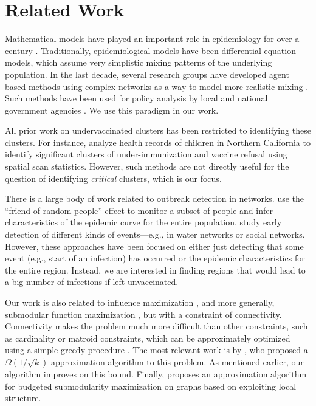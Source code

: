 \section{Related Work}
Mathematical models have played an important role in epidemiology for over a century \cite{anderson+m:book}. Traditionally, epidemiological models have been differential equation models, which assume very simplistic mixing patterns of the underlying population. In the last decade, several research groups have developed agent based methods
using complex networks as a way to model more realistic mixing
\cite{eubank:nature04,longini05:science,fc+06,Liu2015}.
Such methods have been used for policy analysis
by local and national government agencies \cite{halloran:pnas08}.
We use this paradigm in our work.

All prior work on undervaccinated clusters has been restricted to identifying these clusters.
For instance, \cite{lieu2015geographic} analyze health records 
of children in Northern California to identify
significant clusters of under-immunization and vaccine refusal
using spatial scan statistics. However, such methods are not directly useful for the
question of identifying \emph{critical} clusters, which is our focus.

There is a large body of work related to outbreak detection in networks. \cite{christakis:10:sensor} use the ``friend of random people'' effect to monitor a subset of people and infer characteristics of the  epidemic curve for the entire population. \cite{Leskovec@KDD07} study early detection of different kinds of events---e.g., in water networks or social networks. However, these approaches have been focused on either just detecting that some event (e.g., start of an infection) has occurred or the epidemic characteristics for the entire region. Instead, we are interested in finding regions that would lead to a big number of infections if left unvaccinated.

Our work is also related to influence maximization \cite{kempe:sigkdd03}, and more generally, 
submodular function maximization \cite{Krause2014SubmodularFM}, but with a constraint of connectivity. Connectivity makes the problem much more difficult than other constraints, such as cardinality or matroid constraints, which can be approximately optimized using a simple greedy procedure \cite{nemhauser1978analysis}. 
The most relevant work is by \cite{kuo2015maximizing}, who proposed a 
$\Omega(1/\sqrt{k})$ approximation algorithm to this problem. As mentioned earlier, our algorithm \algosubmod{} improves on this bound. Finally,
\cite{krause2006near} proposes an approximation algorithm for budgeted 
submodularity maximization on graphs based on exploiting local structure. 

